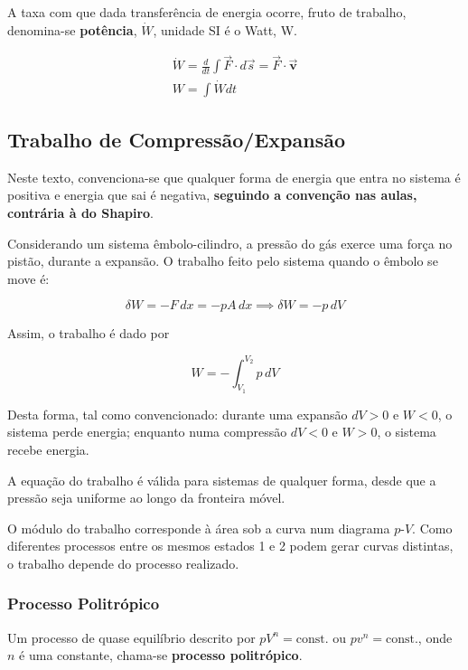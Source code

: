 A taxa com que dada transferência de energia ocorre, fruto de trabalho, denomina-se \textbf{potência}, $\dot{W}$, unidade SI é o Watt, W.

\begin{eqnarray*}
    \dot{W} = \frac{d}{dt} \int \vec{F} \cdot d\vec{s} = \vec{F} \cdot \vec{\mathbf{v}}\\
    W = \int \dot{W} dt
\end{eqnarray*}

\subsection{Trabalho de Compressão/Expansão}

Neste texto, convenciona-se que qualquer forma de energia que entra no sistema é positiva e energia que sai é negativa, \textbf{seguindo a convenção nas aulas, contrária à do Shapiro}.

Considerando um sistema êmbolo-cilindro, a pressão do gás exerce uma força no pistão, durante a expansão. O trabalho feito pelo sistema quando o êmbolo se move é:  

\begin{equation*}
    \delta W = - F \, dx = - pA \, dx \implies \delta W = - p \,dV
\end{equation*}

Assim, o trabalho é dado por 

\begin{equation}
    W = - \int_{V_1}^{V_2} p \, dV
\end{equation}

Desta forma, tal como convencionado: durante uma expansão $dV > 0$ e $W < 0$, o sistema perde energia; enquanto numa compressão $dV < 0$ e $W > 0$, o sistema recebe energia.

A equação do trabalho é válida para sistemas de qualquer forma, desde que a pressão seja uniforme ao longo da fronteira móvel.

O módulo do trabalho corresponde à área sob a curva num diagrama $p$-$V$. Como diferentes processos entre os mesmos estados 1 e 2 podem gerar curvas distintas, o trabalho depende do processo realizado.

\subsubsection{Processo Politrópico}

Um processo de quase equilíbrio descrito por $pV^n = \text{const.}$ ou $pv^n = \text{const.}$, onde $n$ é uma constante, chama-se \textbf{processo politrópico}. 

